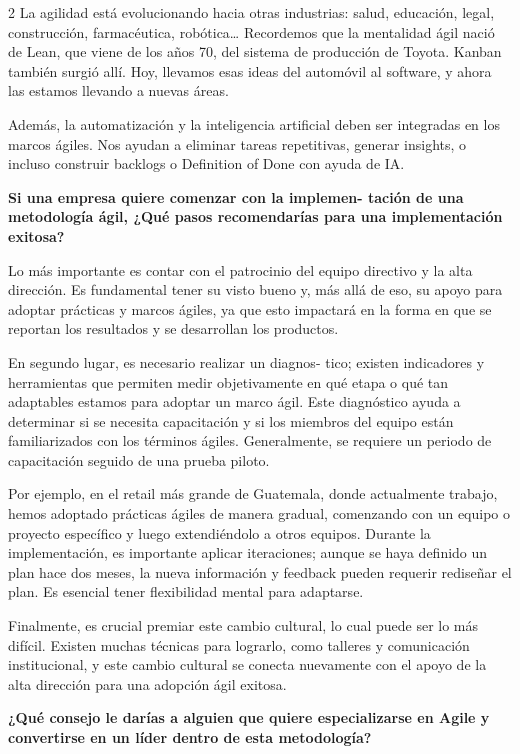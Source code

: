 \documentclass[12pt,spanish,Letterpaper,openany]{book}
\begin{document}
\begin {multicols}{2}
La agilidad está evolucionando hacia otras industrias: salud, educación, legal, construcción, farmacéutica, robótica\ldots{}
Recordemos que la mentalidad ágil nació de Lean, que viene de los años 70, del sistema de producción de Toyota. Kanban también surgió allí. Hoy, llevamos esas ideas del automóvil al software, y ahora las estamos llevando a nuevas áreas.

Además, la automatización y la inteligencia artificial deben ser integradas en los marcos ágiles. Nos ayudan a eliminar tareas repetitivas, generar insights, o incluso construir backlogs o Definition of Done con ayuda de IA.

\textbf{Si una empresa quiere comenzar con la implemen-
tación de una metodología ágil, ¿Qué pasos recomendarías para una implementación exitosa?}

Lo más importante es contar con el patrocinio del equipo directivo y la alta dirección. Es fundamental tener su visto bueno y, más allá de eso, su apoyo para adoptar prácticas y marcos ágiles, ya que esto impactará en la forma en que se reportan los resultados y se desarrollan los productos.

En segundo lugar, es necesario realizar un diagnos-
tico; existen indicadores y herramientas que permiten medir objetivamente en qué etapa o qué tan adaptables estamos para adoptar un marco ágil. Este diagnóstico ayuda a determinar si se necesita capacitación y si los miembros del equipo están familiarizados con los términos ágiles. Generalmente, se requiere un periodo de capacitación seguido de una prueba piloto.

Por ejemplo, en el retail más grande de Guatemala, donde actualmente trabajo, hemos adoptado prácticas ágiles de manera gradual, comenzando con un equipo o proyecto específico y luego extendiéndolo a otros equipos. Durante la implementación, es importante aplicar iteraciones; aunque se haya definido un plan hace dos meses, la nueva información y feedback pueden requerir rediseñar el plan. Es esencial tener flexibilidad mental para adaptarse.

Finalmente, es crucial premiar este cambio cultural, lo cual puede ser lo más difícil. Existen muchas técnicas para lograrlo, como talleres y comunicación institucional, y este cambio cultural se conecta nuevamente con el apoyo de la alta dirección para una adopción ágil exitosa.

\textbf{¿Qué consejo le darías a alguien que quiere especializarse en Agile y convertirse en un líder dentro de esta metodología?}


\end{multicols}
\end{document}
